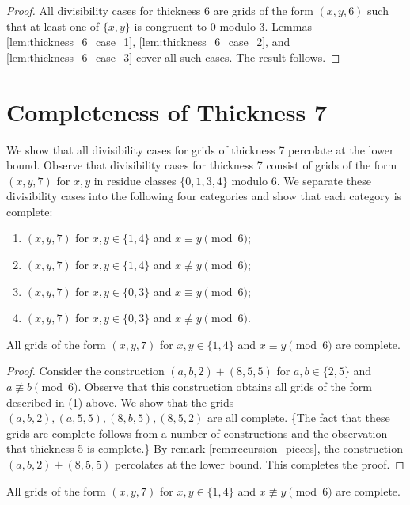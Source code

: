 \begin{proof}
All divisibility cases for thickness 6 are grids of the form $(x,y,6)$ such that at least one of $\{x,y\}$ is congruent to 0 modulo 3. Lemmas \ref{lem:thickness_6_case_1}, \ref{lem:thickness_6_case_2}, and \ref{lem:thickness_6_case_3} cover all such cases. The result follows.
\end{proof}

\section{Completeness of Thickness 7}

We show that all divisibility cases for grids of thickness 7 percolate at the lower bound. Observe that divisibility cases for thickness 7 consist of grids of the form $(x,y,7)$ for $x,y$ in residue classes $\{0,1,3,4\}$ modulo 6. We separate these divisibility cases into the following four categories and show that each category is complete:
\begin{enumerate}
\item $(x,y,7)$ for $x,y \in \{1,4\}$ and $x \equiv y \pmod 6$;
\item $(x,y,7)$ for $x,y \in \{1,4\}$ and $x \not\equiv y \pmod 6$;
\item $(x,y,7)$ for $x,y \in \{0,3\}$ and $x \equiv y \pmod 6$;
\item $(x,y,7)$ for $x,y \in \{0,3\}$ and $x \not\equiv y \pmod 6$.
\end{enumerate}

\begin{lem}
\label{lem:thickness_7_case_1}
All grids of the form $(x,y,7)$ for $x,y \in \{1,4\}$ and $x \equiv y \pmod 6$ are complete.
\end{lem}

\begin{proof}
Consider the construction $(a,b,2) + (8,5,5)$ for $a,b \in \{2,5\}$ and $a \not\equiv b \pmod 6$. Observe that this construction obtains all grids of the form described in (1) above. We show that the grids $(a,b,2), (a,5,5), (8,b,5), (8,5,2)$ are all complete. 
\{The fact that these grids are complete follows from a number of constructions and the observation that thickness 5 is complete.\} 
By remark \ref{rem:recursion_pieces}, the construction $(a,b,2) + (8,5,5)$ percolates at the lower bound. This completes the proof. 
\end{proof}

\begin{lem}
\label{lem:thickness_7_case_2}
All grids of the form $(x,y,7)$ for $x,y \in \{1,4\}$ and $x \not\equiv y \pmod 6$ are complete.
\end{lem}


